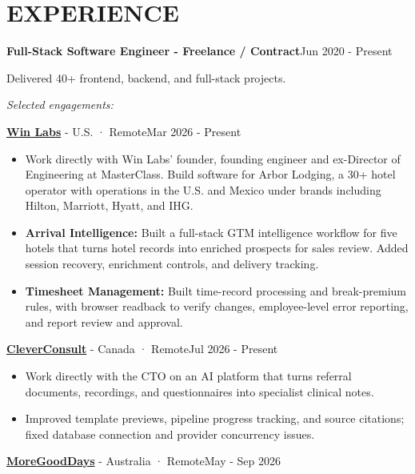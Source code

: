 \documentclass[11pt,letterpaper]{article}
\begin{document}
\section{EXPERIENCE}
\par\vspace{5pt}\textbf{Full-Stack Software Engineer - Freelance / Contract}\hfill Jun 2020 - Present\par
Delivered 40+ frontend, backend, and full-stack projects.\par
\textit{Selected engagements:}\par
\par\vspace{1pt}\textbf{\href{https://winlabs.dev/}{Win Labs}} - U.S. · Remote\hfill Mar 2026 - Present\par
\begin{itemize}
\item Work directly with Win Labs' founder, founding engineer and ex-Director of Engineering at MasterClass. Build software for Arbor Lodging, a 30+ hotel operator with operations in the U.S. and Mexico under brands including Hilton, Marriott, Hyatt, and IHG.
\item \textbf{Arrival Intelligence:} Built a full-stack GTM intelligence workflow for five hotels that turns hotel records into enriched prospects for sales review. Added session recovery, enrichment controls, and delivery tracking.
\item \textbf{Timesheet Management:} Built time-record processing and break-premium rules, with browser readback to verify changes, employee-level error reporting, and report review and approval.
\end{itemize}
\par\vspace{1pt}\textbf{\href{https://www.cleverconsult.ai/}{CleverConsult}} - Canada · Remote\hfill Jul 2026 - Present\par
\begin{itemize}
\item Work directly with the CTO on an AI platform that turns referral documents, recordings, and questionnaires into specialist clinical notes.
\item Improved template previews, pipeline progress tracking, and source citations; fixed database connection and provider concurrency issues.
\end{itemize}
\par\vspace{1pt}\textbf{\href{https://www.moregooddays.com/}{MoreGoodDays}} - Australia · Remote\hfill May - Sep 2026\par
\end{document}
